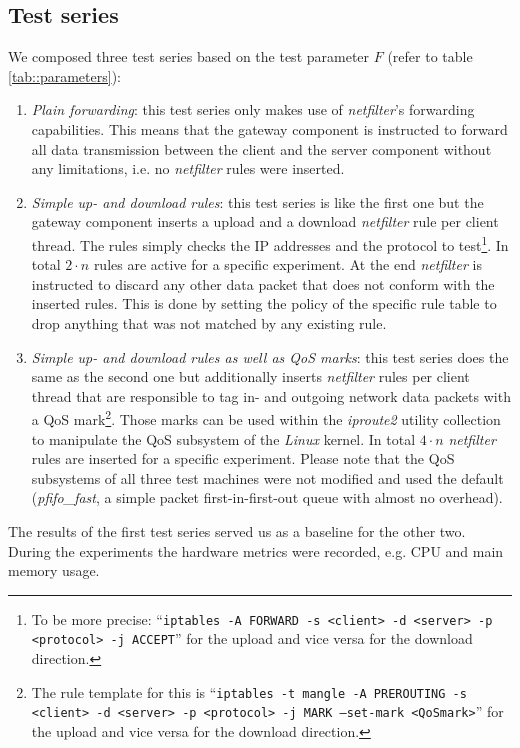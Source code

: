 \documentclass{sig-alternate}
\begin{document}
\subsection{Test series}
\noindent We composed three test series based on the test pa\-ra\-me\-ter $F$ 
(refer to table \ref{tab::parameters}):
\begin{enumerate}
\item \emph{Plain forwarding}: this test series only makes use of 
\emph{netfilter}'s forwarding capabilities. This means that the gateway 
component is instructed to forward all data transmission between the client and 
the server component without any limitations, i.e. no \emph{netfilter} rules 
were inserted.
\item \emph{Simple up- and download rules}: this test series is like the first 
one but the gateway component inserts a upload and a download \emph{netfilter} 
rule per client thread. The rules simply checks the IP addresses and the 
protocol to test\footnote{To be more precise: ``\texttt{iptables -A 
FORWARD -s <client> -d <server> -p <protocol> -j ACCEPT}'' for the upload and 
vice versa for the download direction.}. In total $2 \cdot n$ rules are active 
for a specific experiment. At the end \emph{netfilter} is instructed to discard 
any other data packet that does not conform with the inserted rules. This is 
done by setting the policy of the specific rule table to drop anything that was 
not matched by any existing rule.
\newpage\item \emph{Simple up- and download rules as well as QoS marks}: this 
test series does the same as the se\-cond one but additionally inserts 
\emph{netfilter} rules per client thread that are responsible to tag in- and 
outgoing network data packets with a QoS mark\footnote{The rule template for 
this is ``\texttt{iptables -t mangle -A PREROUTING -s <client> -d <server> -p 
<protocol> -j MARK --set-mark <QoSmark>}'' for the upload and vice versa for 
the download direction.}. Those marks can be used within the \emph{iproute2}
uti\-li\-ty collection to manipulate the QoS subsystem of the \emph{Linux} 
kernel. In total $4 \cdot n$ \emph{netfilter} rules are inserted for a specific 
experiment. Please note that the QoS subsystems of all three test machines were 
not modified and used the default (\emph{pfifo\_fast}, a simple packet 
first-in-first-out queue with almost no overhead).
\end{enumerate}
The results of the first test series served us as a baseline for the other two. 
During the experiments the hardware metrics were recorded, e.g. CPU and main 
memory usa\-ge.
\end{document}
